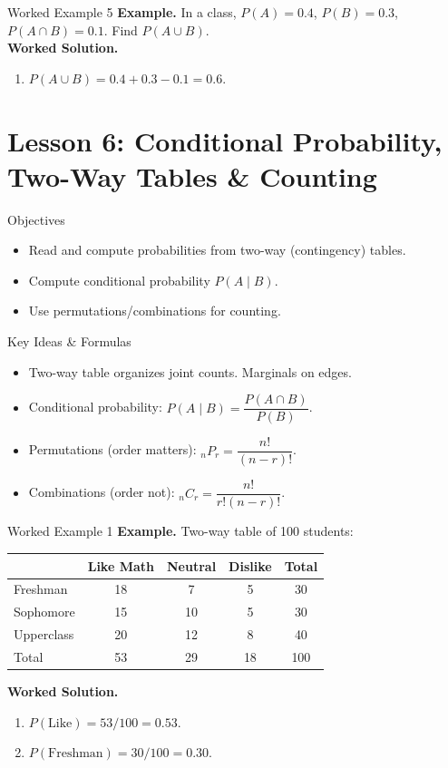 \documentclass[aspectratio=169]{beamer}
\newcommand{\exampletitle}[1]{\vspace{0.25em}\textbf{Example.} #1\vspace{0.25em}}
\newcommand{\worked}{\textbf{Worked Solution.}}
\begin{document}
\begin{frame}{Worked Example 5}
\exampletitle{In a class, $P(A)=0.4$, $P(B)=0.3$, $P(A\cap B)=0.1$. Find $P(A\cup B)$.}\\[0.25em]
\worked
\begin{enumerate}
  \item $P(A\cup B)=0.4+0.3-0.1=0.6$.
\end{enumerate}
\end{frame}

\section{Lesson 6: Conditional Probability, Two-Way Tables \& Counting}

\begin{frame}{Objectives}
\begin{itemize}
  \item Read and compute probabilities from two-way (contingency) tables.
  \item Compute conditional probability $P(A\mid B)$.
  \item Use permutations/combinations for counting.
\end{itemize}
\end{frame}

\begin{frame}{Key Ideas \& Formulas}
\begin{itemize}
  \item Two-way table organizes joint counts. Marginals on edges.
  \item Conditional probability: $P(A\mid B)=\dfrac{P(A\cap B)}{P(B)}$.
  \item Permutations (order matters): $_nP_r=\dfrac{n!}{(n-r)!}$.
  \item Combinations (order not): $_nC_r=\dfrac{n!}{r!(n-r)!}$.
\end{itemize}
\end{frame}

\begin{frame}{Worked Example 1}
\exampletitle{Two-way table of 100 students:}\\[0.25em]
\small
\begin{center}
\begin{tabular}{l|ccc|c}
 & Like Math & Neutral & Dislike & Total\\\hline
Freshman & 18 & 7 & 5 & 30\\
Sophomore & 15 & 10 & 5 & 30\\
Upperclass & 20 & 12 & 8 & 40\\\hline
Total & 53 & 29 & 18 & 100\\
\end{tabular}
\end{center}
\worked
\begin{enumerate}
  \item $P(\text{Like})=53/100=0.53$.
  \item $P(\text{Freshman})=30/100=0.30$.
\end{enumerate}
\end{frame}
\end{document}
